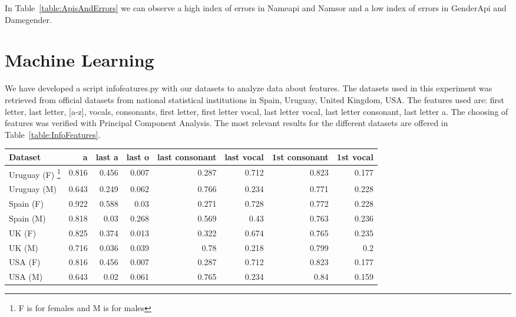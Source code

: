 \documentclass[a4paper]{article}
\begin{document}
In Table~\ref{table:ApisAndErrors} we can observe a high index of errors in Nameapi and Namsor and a low index of errors in GenderApi and Damegender.


\section{Machine Learning}

We have developed a script infofeatures.py with our datasets to analyze data about features.
The datasets used in this experiment was retrieved from official datasets from national statistical
institutions in Spain, Uruguay, United Kingdom, USA. The features used are: first letter, last letter, [a-z], vocals, consonants, first letter, first letter vocal, last letter vocal, last letter consonant, last letter a. 
The choosing of features was verified with Principal Component Analysis.
The most relevant results for the different datasets are offered in Table~\ref{table:InfoFeatures}.

\begin{table*}
\footnotesize
\begin{tabular}[]{lrrrrrrr}
  \hline
Dataset & a & last a & last o & last consonant & last vocal & 1st consonant & 1st vocal  \tabularnewline
  \hline
 Uruguay (F) \footnote{F is for females and M is for males} &    0.816 &         0.456 &         0.007 &                 0.287 &             0.712 &                  0.823 &              0.177  \tabularnewline
 Uruguay (M) \footnotemark[3] &    0.643 &         0.249 &         0.062 &                 0.766 &             0.234 &                  0.771 &              0.228  \tabularnewline
 Spain (F) \footnotemark[3]  &    0.922 &         0.588 &          0.03 &                 0.271 &             0.728 &                  0.772 &              0.228  \tabularnewline
 Spain (M) \footnotemark[3]  &    0.818 &          0.03 &         0.268 &                 0.569 &              0.43 &                  0.763 &              0.236  \tabularnewline
 UK (F) \footnotemark[3]     &    0.825 &         0.374 &         0.013 &                 0.322 &             0.674 &                  0.765 &              0.235  \tabularnewline
 UK (M) \footnotemark[3]     &    0.716 &         0.036 &         0.039 &                  0.78 &             0.218 &                  0.799 &                0.2  \tabularnewline
 USA (F) \footnotemark[3]    &    0.816 &         0.456 &         0.007 &                 0.287 &             0.712 &                  0.823 &              0.177  \tabularnewline
 USA (M) \footnotemark[3]    &    0.643 &          0.02 &         0.061 &                 0.765 &             0.234 &                   0.84 &              0.159  \tabularnewline
\hline
\end{tabular}
\caption{Informative Features in Different Countries}
\label{table:InfoFeatures}
\end{table*}
\end{document}
